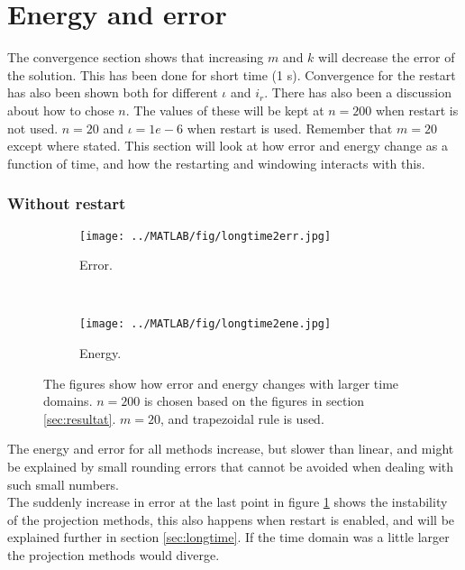 \section{ Energy and error }%
\label{sec:resultconsterergy}
The convergence section shows that increasing $m$ and $k$ will decrease the error of the solution. This has been done for short time (1 s). Convergence for the restart has also been shown both for different $\iota$ and $i_r$. There has also been a discussion about how to chose $n$. The values of these will be kept at $n = 200$ when restart is not used. $n = 20$ and $\iota = 1e-6$ when restart is used. Remember that $m = 20$ except where stated. This section will look at how error and energy change as a function of time, and how the restarting and windowing interacts with this.


\subsubsection{Without restart} %

\begin{figure}[H]
        \centering
        \begin{subfigure}[b]{0.45\textwidth}
                \texttt{[image: ../MATLAB/fig/longtime2err.jpg]}
                \caption{ Error. }
                \label{fig:longtime2err}
        \end{subfigure}
        ~
        \begin{subfigure}[b]{0.45\textwidth}
                \texttt{[image: ../MATLAB/fig/longtime2ene.jpg]}
                \caption{ Energy. }
                \label{fig:longtime8err}
        \end{subfigure}
        \caption{ The figures show how error and energy changes with larger time domains. $n = 200$ is chosen based on the figures in section \ref{sec:resultat}. $m = 20$, and trapezoidal rule is used. }
        \label{fig:SLMenergyerror0}
\end{figure}
The energy and error for all methods increase, but slower than linear, and might be explained by small rounding errors that cannot be avoided when dealing with such small numbers. \\
The suddenly increase in error at the last point in figure \ref{fig:longtime2err} shows the instability of the projection methods, this also happens when restart is enabled, and will be explained further in section \ref{sec:longtime}. If the time domain was a little larger the projection methods would diverge. 

